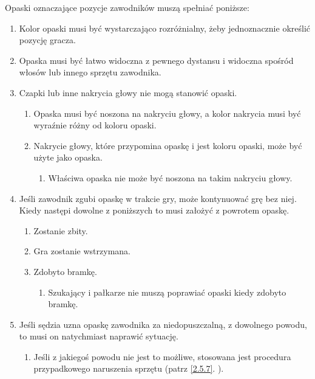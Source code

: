 \documentclass[11pt,a4paper]{article}
\renewcommand{\subsubsection}[1]{
  \oldsubsubsection{#1}%
  \label{\thesubsubsection}
}
\newcommand{\myref}[1]{\ref{#1}. \nameref{#1}}
\begin{document}
\subsubsection{Wymagania opasek}
Opaski oznaczające pozycje zawodników muszą spełniać poniższe:
\begin{enumerate}
  \item Kolor opaski musi być wystarczająco rozróżnialny, żeby jednoznacznie określić pozycję gracza.
  \item Opaska musi być łatwo widoczna z pewnego dystansu i widoczna spośród włosów lub innego sprzętu zawodnika.
  \item Czapki lub inne nakrycia głowy nie mogą stanowić opaski.
  \begin{enumerate}
    \item Opaska musi być noszona na nakryciu głowy, a kolor nakrycia musi być wyraźnie różny od koloru opaski.
    \item Nakrycie głowy, które przypomina opaskę i jest koloru opaski, może być użyte jako opaska.
    \begin{enumerate}
      \item Właściwa opaska nie może być noszona na takim nakryciu głowy.
    \end{enumerate}
  \end{enumerate}
  \item Jeśli zawodnik zgubi opaskę w trakcie gry, może kontynuować grę bez niej. Kiedy następi dowolne z poniższych to musi założyć z powrotem opaskę.
  \begin{enumerate}
    \item Zostanie zbity.
    \item Gra zostanie wstrzymana.
    \item Zdobyto bramkę.
    \begin{enumerate}
      \item Szukający i pałkarze nie muszą poprawiać opaski kiedy zdobyto bramkę.
    \end{enumerate}
  \end{enumerate}
  \item Jeśli sędzia uzna opaskę zawodnika za niedopuszczalną, z dowolnego powodu, to musi on natychmiast naprawić sytuację.
  \begin{enumerate}
    \item Jeśli z jakiegoś powodu nie jest to możliwe, stosowana jest procedura przypadkowego naruszenia sprzętu (patrz \myref{2.5.7}).
  \end{enumerate}
\end{enumerate}
\end{document}
